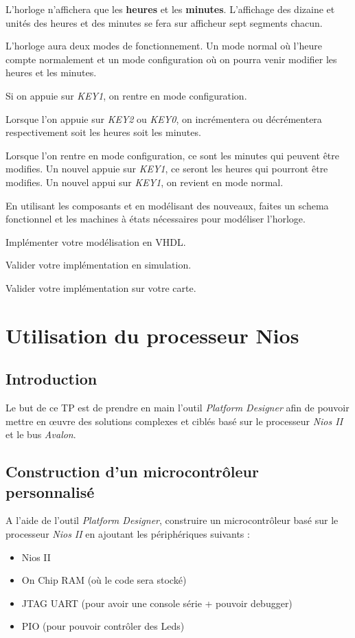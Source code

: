 L'horloge n'affichera que les \textbf{heures} et les \textbf{minutes}. L'affichage des dizaine et unités des heures et des minutes se fera sur afficheur sept segments chacun.

\medskip

L'horloge aura deux modes de fonctionnement. Un mode normal où l'heure compte normalement et un mode configuration où on pourra venir modifier les heures et les minutes.

\medskip
Si on appuie sur \textit{KEY1}, on rentre en mode configuration.

\medskip 

Lorsque l'on appuie sur \textit{KEY2} ou \textit{KEY0}, on incrémentera ou décrémentera respectivement soit les heures soit les minutes.

\medskip

Lorsque l'on rentre en mode configuration, ce sont les minutes qui peuvent être modifies. Un nouvel appuie sur \textit{KEY1}, ce seront les heures qui pourront être modifies. Un nouvel appui sur \textit{KEY1}, on revient en mode normal.

\medskip

En utilisant les composants et en modélisant des nouveaux, faites un schema fonctionnel et les machines à états nécessaires pour modéliser l'horloge.

\medskip

Implémenter votre modélisation en VHDL.

\medskip

Valider votre implémentation en simulation.

\medskip

Valider votre implémentation sur votre carte.

\chapter{Utilisation du processeur Nios}
\section{Introduction}
Le but de ce TP est de prendre en main l'outil \textit{Platform Designer} afin de pouvoir mettre en œuvre des solutions complexes et ciblés basé sur le processeur \textit{Nios II} et le bus \textit{Avalon}.


\section{Construction d'un microcontrôleur personnalisé}
\label{sec:BuildMCU}
A l'aide de l'outil \textit{Platform Designer}, construire un microcontrôleur basé sur le processeur \textit{Nios II} en ajoutant les périphériques suivants :
\begin{itemize}
    \item Nios II
    \item On Chip RAM (où le code sera stocké)
    \item JTAG UART (pour avoir une console série + pouvoir debugger)
    \item PIO (pour pouvoir contrôler des Leds)
\end{itemize}

